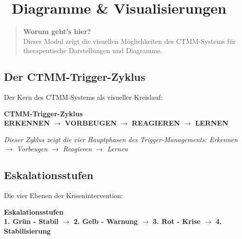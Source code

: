 
\section*{\textcolor{ctmmBlue}{\faPalette~Diagramme \& Visualisierungen}}

\begin{quote}
\textbf{\textcolor{ctmmBlue}{Worum geht's hier?}}\\
Dieses Modul zeigt die visuellen Möglichkeiten des CTMM-Systems für therapeutische Darstellungen und Diagramme.
\end{quote}

\subsection*{\textcolor{ctmmBlue}{Der CTMM-Trigger-Zyklus}}

Der Kern des CTMM-Systems als visueller Kreislauf:

\begin{center}
\begin{tcolorbox}[colback=ctmmBlue!10!white,colframe=ctmmBlue,width=10cm]
\centering
\textbf{CTMM-Trigger-Zyklus}\\[0.5cm]
\textcolor{ctmmBlue}{\textbf{ERKENNEN}} $\rightarrow$ \textcolor{ctmmGreen}{\textbf{VORBEUGEN}} $\rightarrow$ \textcolor{ctmmOrange}{\textbf{REAGIEREN}} $\rightarrow$ \textcolor{ctmmPurple}{\textbf{LERNEN}}
\end{tcolorbox}
\end{center}

\textit{Dieser Zyklus zeigt die vier Hauptphasen des Trigger-Managements: Erkennen $\rightarrow$ Vorbeugen $\rightarrow$ Reagieren $\rightarrow$ Lernen}

\subsection*{\textcolor{ctmmOrange}{Eskalationsstufen}}

Die vier Ebenen der Krisenintervention:

\begin{center}
\begin{tcolorbox}[colback=ctmmOrange!10!white,colframe=ctmmOrange,width=12cm]
\centering
\textbf{Eskalationsstufen}\\[0.5cm]
\textcolor{ctmmGreen}{\textbf{1. Grün - Stabil}} $\rightarrow$ \textcolor{ctmmOrange}{\textbf{2. Gelb - Warnung}} $\rightarrow$ \textcolor{ctmmRed}{\textbf{3. Rot - Krise}} $\rightarrow$ \textcolor{ctmmPurple}{\textbf{4. Stabilisierung}}
\end{tcolorbox}
\end{center}

